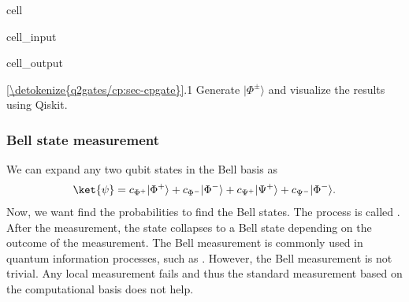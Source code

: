 \documentclass[letterpaper,10pt,english]{jupyterBook}
\begin{document}
\begin{sphinxuseclass}{cell}\begin{sphinxVerbatimInput}

\begin{sphinxuseclass}{cell_input}
\begin{sphinxVerbatim}[commandchars=\\\{\}]
   
\end{sphinxVerbatim}

\end{sphinxuseclass}\end{sphinxVerbatimInput}
\begin{sphinxVerbatimOutput}

\begin{sphinxuseclass}{cell_output}
\noindent{}

\end{sphinxuseclass}\end{sphinxVerbatimOutput}

\end{sphinxuseclass}
\sphinxAtStartPar
{}  \hyperref[\detokenize{q2gates/cp:sec-cpgate}]{\ref{\detokenize{q2gates/cp:sec-cpgate}}}.1  Generate \(|\Phi^{\pm}\rangle\) and visualize the results using Qiskit.


\subsubsection{Bell state measurement}
\label{\detokenize{q2gates/cx:bell-state-measurement}}
\sphinxAtStartPar
We can expand any two qubit states in the Bell basis as
\begin{equation}\label{equation:q2gates/cx:bell-expansion}
\begin{split}
\ket{\psi} = c_{\Phi^+} |\Phi^{+}\rangle + c_{\Phi^-} |\Phi^{-}\rangle + c_{\Psi^+} |\Psi^{+}\rangle + c_{\Psi^-} |\Phi^{-}\rangle .
\end{split}
\end{equation}
\sphinxAtStartPar
Now, we want find the probabilities to find the Bell states. The process is called .  After the measurement, the state collapses to a Bell state depending on the outcome of the measurement.  The Bell measurement is commonly used in quantum information processes, such as .  However, the Bell measurement is not trivial.  Any local measurement fails and thus the standard measurement based on the computational basis does not help.
\end{document}
